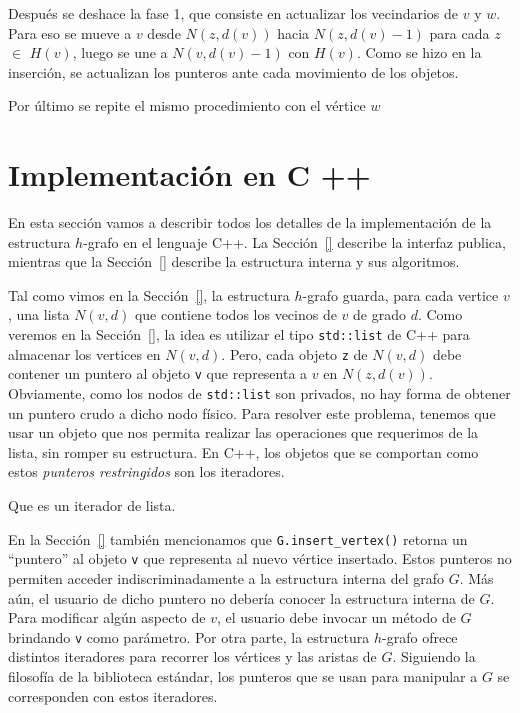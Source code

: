 \documentclass[a4paper,12pt]{article}
\begin{document}
Después se deshace la fase 1, que consiste en actualizar  los vecindarios de $v$ y $w$. Para eso se mueve a $v$ desde $N(z,d(v))$ hacia $N(z,d(v)-1)$ para cada $z$ ${\in}$ $H(v)$, luego se une a  $N(v,d(v)-1)$ con $H(v)$. Como se hizo en la inserción, se actualizan los punteros ante cada movimiento de los objetos.

Por último se repite el mismo procedimiento con el vértice $w$


\section{Implementación en C ++}
\label{sec:c++}

En esta sección vamos a describir todos los detalles de la implementación de la estructura $h$-grafo en el lenguaje C++.  La Sección~\ref{} describe la interfaz publica, mientras que la Sección~\ref{} describe la estructura interna y sus algoritmos.  

Tal como vimos en la Sección~\ref{}, la estructura $h$-grafo guarda, para cada vertice $v$, una lista $N(v, d)$ que contiene todos los vecinos de $v$ de grado $d$.  Como veremos en la Sección~\ref{}, la idea es utilizar el tipo \texttt{std::list} de C++ para almacenar los vertices en $N(v, d)$.  Pero, cada objeto \texttt{z} de $N(v, d)$ debe contener un puntero al objeto \texttt{v} que representa a $v$ en $N(z, d(v))$.  Obviamente, como los nodos de \texttt{std::list} son privados, no hay forma de obtener un puntero crudo a dicho nodo físico.  Para resolver este problema, tenemos que usar un objeto que nos permita realizar las operaciones que requerimos de la lista, sin romper su estructura.  En C++, los objetos que se comportan como estos \emph{punteros restringidos} son los iteradores.  

Que es un iterador de lista.

En la Sección~\ref{} también mencionamos que \texttt{G.insert\_vertex()} retorna un ``puntero'' al objeto \texttt{v} que representa al nuevo vértice insertado.  Estos punteros no permiten acceder indiscriminadamente a la estructura interna del grafo $G$.  Más aún, el usuario de dicho puntero no debería conocer la estructura interna de $G$.  Para modificar algún aspecto de $v$, el usuario debe invocar un método de $G$ brindando \texttt{v} como parámetro.  Por otra parte, la estructura $h$-grafo ofrece distintos iteradores para recorrer los vértices y las aristas de $G$.  Siguiendo la filosofía de la biblioteca estándar, los punteros que se usan para manipular a $G$ se corresponden con estos iteradores.
\end{document}
